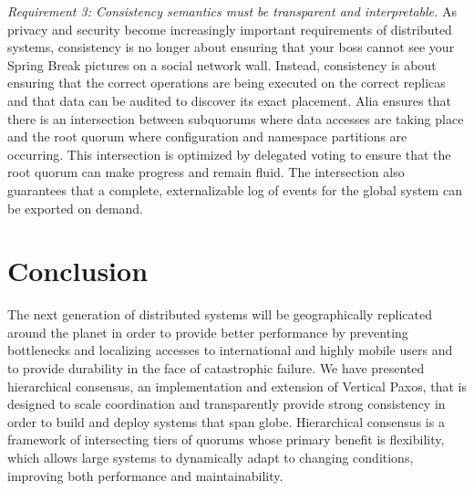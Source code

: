 \documentclass[10pt,conference]{IEEEtran}
\newcommand{\hc}{hierarchical consensus\xspace}
\newcommand{\Hc}{Hierarchical consensus\xspace}
\begin{document}
\emph{Requirement 3: Consistency semantics must be transparent and interpretable.}
As privacy and security become increasingly important requirements of distributed
systems, consistency is no longer about ensuring that your boss cannot see your
Spring Break pictures on a social network wall.
Instead, consistency is about ensuring that the correct operations are being
executed on the correct replicas and that data can be audited to discover its
exact placement.
Alia ensures that there is an intersection between subquorums where data accesses
are taking place and the root quorum where configuration and namespace partitions
are occurring.
This intersection is optimized by delegated voting to ensure that the root
quorum can make progress and remain fluid.
The intersection also guarantees that a complete, externalizable log of events
for the global system can be exported on demand.





\section{Conclusion}
\label{section:conclusion}

The next generation of distributed systems will be geographically replicated around the
planet in order to provide better performance by preventing bottlenecks and localizing
accesses to international and highly mobile users and to provide durability in the face
of catastrophic failure.
We have presented \hc, an implementation and extension of Vertical Paxos, that is
designed to scale coordination and transparently provide strong consistency in order to
build and deploy systems that span globe.
\Hc is a framework of intersecting tiers of quorums whose primary benefit is flexibility,
which allows large systems to dynamically adapt to changing conditions, improving both
performance and maintainability.
\end{document}
